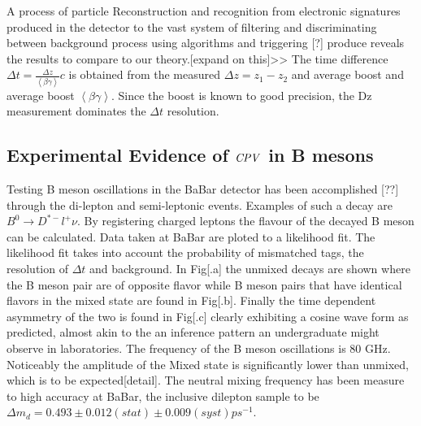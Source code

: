 A process of particle Reconstruction and recognition from electronic signatures produced in the detector to the vast system of filtering and discriminating between background process using algorithms and triggering [?] produce reveals the results to compare to our theory.[expand on this]>> The time difference $\Delta t = \frac{\Delta z}{\left< \beta\gamma\right>} c$ is obtained from the measured $\Delta z=z_1 - z_2$ and average boost and average boost $\left<\beta\gamma\right>$. Since the boost is known to good precision, the Dz measurement dominates the $\Delta t$ resolution.
\subsection{Experimental Evidence of $\it{CPV}$ in B mesons}
Testing B meson oscillations in the BaBar detector has been accomplished [??] through the di-lepton and semi-leptonic events. Examples of such a decay are 
$B^{0}\rightarrow D^{*-}l^{+}\nu$. By registering charged leptons the flavour of the decayed B meson can be calculated. Data taken at BaBar are ploted to a likelihood fit. The likelihood fit takes into account the probability of mismatched tags, the resolution of $\Delta t$ and background. In Fig[.a] the unmixed decays are shown where the B meson pair are of opposite flavor while B meson pairs that have identical flavors in the mixed state are found in Fig[.b]. Finally the  time dependent asymmetry of the two is found in Fig[.c] clearly exhibiting a cosine wave form as predicted, almost akin to the an inference pattern an undergraduate might observe in laboratories. The frequency of the B meson oscillations is 80 GHz. Noticeably the amplitude of the Mixed state is significantly lower than unmixed, which is to be expected[detail]. The neutral mixing frequency has been measure to high accuracy at BaBar, the inclusive dilepton sample to be $\Delta m_d = 0.493 \pm 0.012(stat) \pm 0.009(syst) ps^{-1}$.

